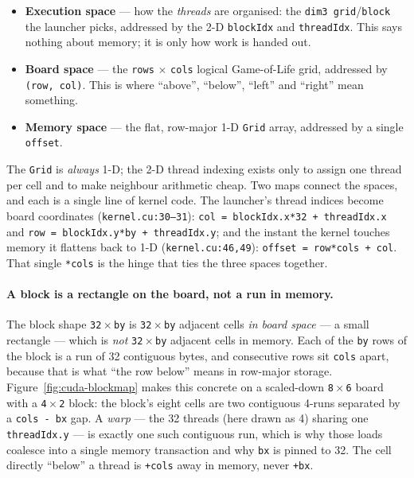 \documentclass[
	english,
	letterpaper, oneside
]{article}
\begin{document}
\begin{itemize}
	\item \textbf{Execution space} --- how the \emph{threads} are organised: the
	\texttt{dim3 grid}/\texttt{block} the launcher picks, addressed by the 2-D
	\texttt{blockIdx} and \texttt{threadIdx}. This says nothing about memory; it is
	only how work is handed out.
	\item \textbf{Board space} --- the \texttt{rows} $\times$ \texttt{cols} logical
	Game-of-Life grid, addressed by \texttt{(row, col)}. This is where ``above'',
	``below'', ``left'' and ``right'' mean something.
	\item \textbf{Memory space} --- the flat, row-major 1-D \texttt{Grid} array,
	addressed by a single \texttt{offset}.
\end{itemize}

The \texttt{Grid} is \emph{always} 1-D; the 2-D thread indexing exists only to
assign one thread per cell and to make neighbour arithmetic cheap. Two maps
connect the spaces, and each is a single line of kernel code. The launcher's
thread indices become board coordinates (\texttt{kernel.cu:30--31}):
\texttt{col = blockIdx.x*32 + threadIdx.x} and
\texttt{row = blockIdx.y*by + threadIdx.y}; and the instant the kernel touches
memory it flattens back to 1-D (\texttt{kernel.cu:46,49}):
\texttt{offset = row*cols + col}. That single \texttt{*cols} is the hinge that
ties the three spaces together.


\paragraph{A block is a rectangle on the board, not a run in memory.} The block
shape \texttt{32}\,$\times$\,\texttt{by} is \texttt{32}\,$\times$\,\texttt{by}
adjacent cells \emph{in board space} --- a small rectangle --- which is
\emph{not} \texttt{32}\,$\times$\,\texttt{by} adjacent cells in memory. Each of
the \texttt{by} rows of the block is a run of 32 contiguous bytes, and
consecutive rows sit \texttt{cols} apart, because that is what ``the row below''
means in row-major storage. Figure~\ref{fig:cuda-blockmap} makes this concrete on
a scaled-down \texttt{8}\,$\times$\,\texttt{6} board with a
\texttt{4}\,$\times$\,\texttt{2} block: the block's eight cells are two contiguous
4-runs separated by a \texttt{cols - bx} gap. A \emph{warp} --- the 32 threads
(here drawn as 4) sharing one \texttt{threadIdx.y} --- is exactly one such
contiguous run, which is why those loads coalesce into a single memory
transaction and why \texttt{bx} is pinned to 32. The cell directly ``below'' a
thread is \texttt{+cols} away in memory, never \texttt{+bx}.
\end{document}
